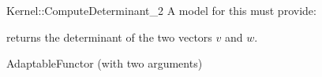 \begin{ccRefFunctionObjectConcept}{Kernel::ComputeDeterminant_2}
A model for this must provide:


       {returns the determinant of the two vectors $v$ and $w$. }

\ccRefines
AdaptableFunctor (with two arguments)

\ccSeeAlso
{} \\
  \\

\end{ccRefFunctionObjectConcept}

